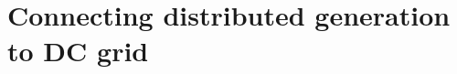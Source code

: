 \documentclass{report}
\begin{document}
\chapter{Connecting distributed generation to DC grid}

%


 
 
\end{document}

